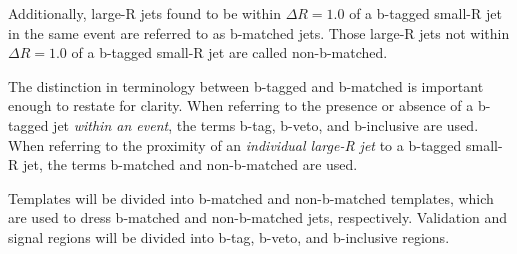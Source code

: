 Additionally, large-R jets found to be within $\Delta R=1.0$ of a b-tagged small-R jet in the same event are referred to as b-matched jets.
Those large-R jets not within $\Delta R=1.0$ of a b-tagged small-R jet are called non-b-matched.

The distinction in terminology between b-tagged and b-matched is important enough to restate for clarity.
When referring to the presence or absence of a b-tagged jet \textit{within an event}, the terms b-tag, b-veto, and b-inclusive are used.
When referring to the proximity of an \textit{individual large-R jet} to a b-tagged small-R jet, the terms b-matched and non-b-matched are used.

Templates will be divided into b-matched and non-b-matched templates, which are used to dress b-matched and non-b-matched jets, respectively.
Validation and signal regions will be divided into b-tag, b-veto, and b-inclusive regions.
